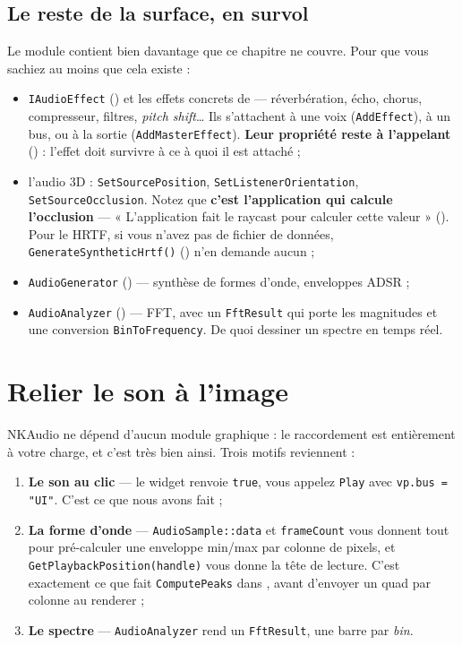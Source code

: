 \subsection{Le reste de la surface, en survol}

Le module contient bien davantage que ce chapitre ne couvre. Pour que vous
sachiez au moins que cela existe :

\begin{itemize}
  \item \texttt{IAudioEffect} () et les effets concrets de
         — réverbération, écho, chorus, compresseur,
        filtres, \emph{pitch shift}\dots{} Ils s'attachent à une voix
        (\texttt{AddEffect}), à un bus, ou à la sortie
        (\texttt{AddMasterEffect}). \textbf{Leur propriété reste à l'appelant}
        () : l'effet doit survivre à ce à quoi il est
        attaché ;
  \item l'audio 3D : \texttt{SetSourcePosition}, \texttt{SetListenerOrientation},
        \texttt{SetSourceOcclusion}. Notez que \textbf{c'est l'application qui
        calcule l'occlusion} — « L'application fait le raycast pour calculer
        cette valeur » (). Pour le HRTF, si vous
        n'avez pas de fichier de données, \texttt{GenerateSyntheticHrtf()}
        () n'en demande aucun ;
  \item \texttt{AudioGenerator} () — synthèse de formes
        d'onde, enveloppes ADSR ;
  \item \texttt{AudioAnalyzer} () — FFT, avec un
        \texttt{FftResult} qui porte les magnitudes et une conversion
        \texttt{BinToFrequency}. De quoi dessiner un spectre en temps réel.
\end{itemize}

\section{Relier le son à l'image}

NKAudio ne dépend d'aucun module graphique : le raccordement est entièrement à
votre charge, et c'est très bien ainsi. Trois motifs reviennent :

\begin{enumerate}
  \item \textbf{Le son au clic} — le widget renvoie \texttt{true}, vous appelez
        \texttt{Play} avec \texttt{vp.bus = "UI"}. C'est ce que nous avons fait ;
  \item \textbf{La forme d'onde} — \texttt{AudioSample::data} et
        \texttt{frameCount} vous donnent tout pour pré-calculer une enveloppe
        min/max par colonne de pixels, et \texttt{GetPlaybackPosition(handle)}
        vous donne la tête de lecture. C'est exactement ce que fait
        \texttt{ComputePeaks} dans
        , avant d'envoyer
        un quad par colonne au renderer ;
  \item \textbf{Le spectre} — \texttt{AudioAnalyzer} rend un \texttt{FftResult},
        une barre par \emph{bin}.
\end{enumerate}

